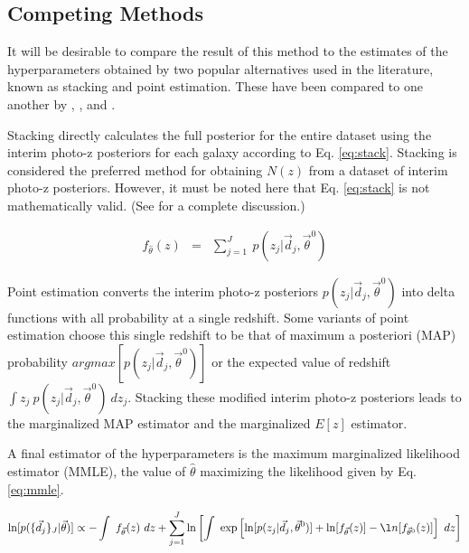 \documentclass[preprint]{aastex}
\begin{document}
\clearpage
\subsection{Competing Methods}
\label{sec:sheldon}

It will be desirable to compare the result of this method to the estimates of 
the hyperparameters obtained by two popular alternatives used in the 
literature, known as stacking and point estimation.   These have been compared 
to one another by \citet{Hildebrandt2012}, \citet{Benjamin2013}, and 
\citet{Asorey2016}.

Stacking directly calculates the full posterior for the entire dataset using 
the interim photo-z posteriors for each galaxy according to Eq. \ref{eq:stack}. 
 \citep{Lima2008}  Stacking is considered the preferred method for obtaining 
$N(z)$ from a dataset of interim photo-z posteriors.  \citep{Sheldon2012, 
Kelly2014, Benjamin2013, Bonnett2015a, Viironen2015, Asorey2016}  However, it 
must be noted here that Eq. \ref{eq:stack} is not mathematically valid.  (See 
\citet{Hogg2012} for a complete discussion.)  

\begin{eqnarray}
\label{eq:stack}
f_{\hat{\theta}}(z) &=& \sum_{j=1}^{J}\ p(z_{j}|\vec{d}_{j},\vec{\theta}^{0})
\end{eqnarray}

Point estimation converts the interim photo-z posteriors 
$p(z_{j}|\vec{d}_{j},\vec{\theta}^{0})$ into delta functions with all 
probability at a single redshift.  Some variants of point estimation choose 
this single redshift to be that of maximum a posteriori (MAP) probability 
$argmax[p(z_{j}|\vec{d}_{j},\vec{\theta}^{0})]$ or the expected value of 
redshift $\int z_{j}\ p(z_{j}|\vec{d}_{j},\vec{\theta}^{0})\ dz_{j}$.  Stacking 
these modified interim photo-z posteriors leads to the marginalized MAP 
estimator and the marginalized $E[z]$ estimator.

A final estimator of the hyperparameters is the maximum marginalized likelihood 
estimator (MMLE), the value of $\hat{\theta}$ maximizing the likelihood given 
by Eq. \ref{eq:mmle}.

\begin{eqnarray}
\label{eq:mmle}
\ln[p(\{\vec{d}_{j}\}_{J}|\vec{\theta})] \propto -\int\ f_{\vec{\theta}}(z)\ 
dz+\sum_{j=1}^{J}\ln\left[\int\ 
\exp\left[\ln[p(z_{j}|\vec{d}_{j},\vec{\theta}^{0})]+\ln[f_{\vec{\theta}}(z)]-\l
n[f_{\vec{\theta}^{0}}(z)]\right]\ dz\right]
\end{eqnarray}
\end{document}
